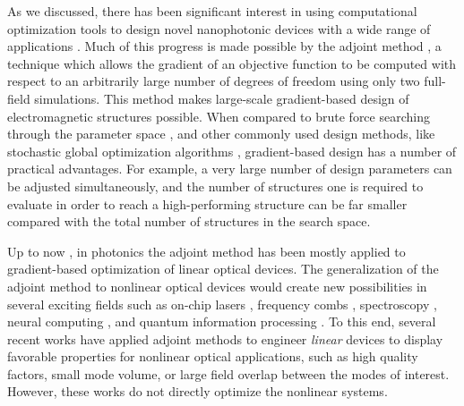 
As we discussed, there has been significant interest in using computational optimization tools to design novel nanophotonic devices with a wide range of applications \cite{lalau-keraly_adjoint_2013,wang_adjoint-based_2018,elesin_design_2012,piggott_fabrication-constrained_2017,piggott_inverse_2015,kao_maximizing_2005,hughes_method_2017, molesky_outlook_2018,sigmund_systematic_2003,matzen_systematic_2011,jensen_topology_2005,frellsen_topology_2016, shen_integrated-nanophotonics_2015,shen_design_2003, Minkov2014, Minkov2015, shi_optimization_2018,veronis_method_2004}. Much of this progress \cite{lalau-keraly_adjoint_2013,wang_adjoint-based_2018,elesin_design_2012,piggott_fabrication-constrained_2017,piggott_inverse_2015,kao_maximizing_2005,hughes_method_2017, molesky_outlook_2018,sigmund_systematic_2003,matzen_systematic_2011,jensen_topology_2005,frellsen_topology_2016} is made possible by the adjoint method \cite{giles2000introduction, veronis_method_2004}, a technique which allows the gradient of an objective function to be computed with respect to an arbitrarily large number of degrees of freedom using only two full-field simulations.  This method
makes large-scale gradient-based design of electromagnetic structures possible. When
compared to brute force searching through the parameter space \cite{shen_integrated-nanophotonics_2015}, and other commonly used design methods,
like stochastic global optimization algorithms \cite{shen_design_2003, Minkov2014, Minkov2015, shi_optimization_2018}, gradient-based design has a number of practical advantages. For example, a very large number of design parameters can be adjusted simultaneously, and the number of structures one is required to evaluate in order to reach a high-performing structure can be far smaller compared with the total number of structures in the search space. 

Up to now \cite{hughes2018adjoint}, in photonics the adjoint method has been mostly applied to gradient-based optimization of linear optical devices. The generalization of the adjoint method to nonlinear optical devices would create new possibilities in several exciting fields such as on-chip lasers \cite{yamashita_raman_2015}, frequency combs \cite{okawachi_octave-spanning_2011}, spectroscopy \cite{moon_absolute_1997}, neural computing \cite{khoram2018stochastic}, and quantum information processing \cite{guo_-chip_2016}.  To this end, several recent works \cite{lin_cavity-enhanced_2016,lin_topology_2017,bravo-abad_enhanced_2007} have applied adjoint methods to engineer \textit{linear} devices to display favorable properties for nonlinear optical applications, such as high quality factors, small mode volume, or large field overlap between the modes of interest.  However, these works do not directly optimize the nonlinear systems.

